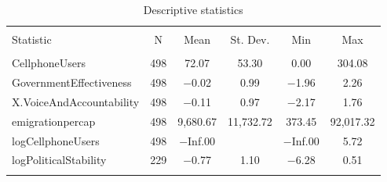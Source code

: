 
\begin{table}[!htbp] \centering 
  \caption{Descriptive statistics} 
  \label{labels1} 
\begin{tabular}{@{\extracolsep{5pt}}lccccc} 
\\[-1.8ex]\hline 
\hline \\[-1.8ex] 
Statistic & \multicolumn{1}{c}{N} & \multicolumn{1}{c}{Mean} & \multicolumn{1}{c}{St. Dev.} & \multicolumn{1}{c}{Min} & \multicolumn{1}{c}{Max} \\ 
\hline \\[-1.8ex] 
CellphoneUsers & 498 & 72.07 & 53.30 & 0.00 & 304.08 \\ 
GovernmentEffectiveness & 498 & $-$0.02 & 0.99 & $-$1.96 & 2.26 \\ 
X.VoiceAndAccountability & 498 & $-$0.11 & 0.97 & $-$2.17 & 1.76 \\ 
emigrationpercap & 498 & 9,680.67 & 11,732.72 & 373.45 & 92,017.32 \\ 
logCellphoneUsers & 498 & $-$Inf.00 &  & $-$Inf.00 & 5.72 \\ 
logPoliticalStability & 229 & $-$0.77 & 1.10 & $-$6.28 & 0.51 \\ 
\hline \\[-1.8ex] 
\end{tabular} 
\end{table} 
